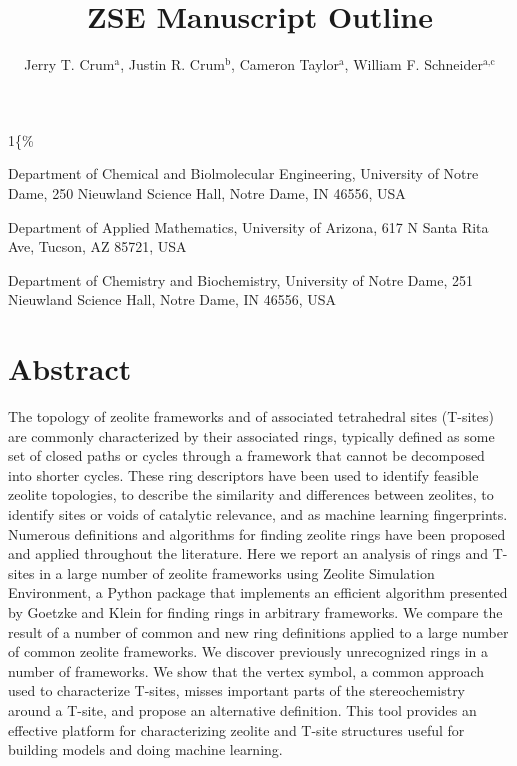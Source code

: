 \documentclass[11pt]{article}
\author{Jerry T. Crum\(^{\text{a}}\), Justin R. Crum\(^{\text{b}}\), Cameron Taylor\(^{\text{a}}\), William F. Schneider\(^{\text{a,c}}\)}
\date{}
\title{ZSE Manuscript Outline}
\begin{document}
\begin{OPTIONS}
\def\udesoftecoverride\#1\mainmatter\{\%
  \AfterEndPreamble{#1\mainmatter}
\end{OPTIONS}

\maketitle

\begin{asparaenum}[\expandafter\textsuperscript a ]
\item Department of Chemical and Biolmolecular Engineering, University of Notre Dame, 250 Nieuwland Science Hall, Notre Dame, IN 46556, USA \\
\item Department of Applied Mathematics, University of Arizona, 617 N Santa Rita Ave, Tucson, AZ 85721, USA\\
\item Department of Chemistry and Biochemistry, University of Notre Dame, 251 Nieuwland Science Hall, Notre Dame, IN 46556, USA
\end{asparaenum}

\newpage
\section{Abstract}
\label{sec:org14a7c72}
The topology of zeolite frameworks and of associated tetrahedral sites (T-sites) are commonly characterized by their associated rings, typically defined as some set of closed paths or cycles through a framework that cannot be decomposed into shorter cycles. These ring descriptors have been used to identify feasible zeolite topologies, to describe the similarity and differences between zeolites, to identify sites or voids of catalytic relevance, and as machine learning fingerprints. Numerous definitions and algorithms for finding zeolite rings have been proposed and applied throughout the literature. Here we report an analysis of rings and T-sites in a large number of zeolite frameworks using Zeolite Simulation Environment, a Python package that implements an efficient algorithm presented by Goetzke and Klein for finding rings in arbitrary frameworks. We compare the result of a number of common and new ring definitions applied to a large number of common zeolite frameworks. We discover previously unrecognized rings in a number of frameworks. We show that the vertex symbol, a common approach used to characterize T-sites, misses important parts of the stereochemistry around a T-site, and propose an alternative definition. This tool provides an effective platform for characterizing zeolite and T-site structures useful for building models and doing machine learning. 
\end{document}
